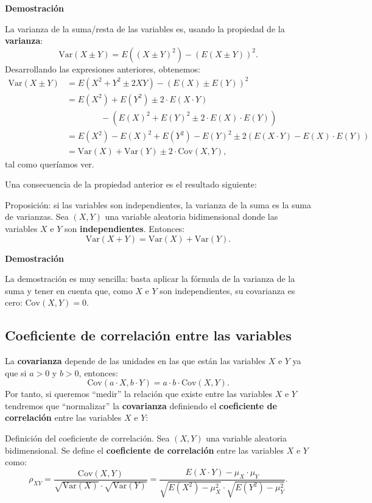 \documentclass[]{book}
\begin{document}
\textbf{Demostración}

La varianza de la suma/resta de las variables es, usando la propiedad de la \textbf{varianza}:
\[
\mathrm{Var}(X\pm Y)=E\left((X\pm Y)^2\right)-\left(E(X\pm Y)\right)^2.
\]
Desarrollando las expresiones anteriores, obtenemos:
\[
\begin{array}{rl}
\mathrm{Var}(X\pm Y) & =E\left(X^2+Y^2\pm 2XY\right)-\left(E(X)\pm E(Y)\right)^2 \\ & =
E(X^2)+E(Y^2)\pm 2\cdot E(X\cdot Y) \\ &\qquad\qquad - \left(E(X)^2+E(Y)^2\pm 2\cdot E(X)\cdot E(Y)\right)
\\ & = E(X^2)-E(X)^2+E(Y^2)-E(Y)^2\pm 2(E(X\cdot Y)-E(X)\cdot E(Y)) \\ & = \mathrm{Var}(X)+\mathrm{Var}(Y)\pm 2\cdot \mathrm{Cov}(X,Y),
\end{array}
\]
tal como queríamos ver.

Una consecuencia de la propiedad anterior es el resultado siguiente:

Proposición: si las variables son independientes, la varianza de la suma es la suma de varianzas.
Sea \((X,Y)\) una variable aleatoria bidimensional donde las variables \(X\) e \(Y\) son \textbf{independientes}.
Entonces:
\[
\mathrm{Var}(X+Y)=\mathrm{Var}(X)+\mathrm{Var}(Y).
\]

\textbf{Demostración}

La demostración es muy sencilla: basta aplicar la fórmula de la varianza de la suma y tener en cuenta que, como \(X\) e \(Y\) son independientes, su covarianza es cero: \(\mathrm{Cov}(X,Y)=0\).

\hypertarget{coeficiente-de-correlaciuxf3n-entre-las-variables}{%
\subsection{Coeficiente de correlación entre las variables}\label{coeficiente-de-correlaciuxf3n-entre-las-variables}}

La \textbf{covarianza} depende de las unidades en las que están las variables \(X\) e \(Y\) ya que si \(a>0\) y \(b>0\), entonces:
\[
\mathrm{Cov}(a\cdot X,b\cdot Y)=a\cdot b\cdot \mathrm{Cov}(X,Y).
\]
Por tanto, si queremos ``medir'' la relación que existe entre las variables \(X\) e \(Y\) tendremos que ``normalizar'' la \textbf{covarianza} definiendo el \textbf{coeficiente de correlación} entre las variables \(X\) e \(Y\):

Definición del coeficiente de correlación.
Sea \((X,Y)\) una variable aleatoria bidimensional. Se define el \textbf{coeficiente de correlación} entre las variables \(X\) e \(Y\) como:
\[
\rho_{XY}=\frac{\mathrm{Cov}(X,Y)}{\sqrt{\mathrm{Var}(X)}\cdot\sqrt{\mathrm{Var}(Y)}}=\frac{E(X\cdot Y)-\mu_X\cdot \mu_Y}{\sqrt{E\left(X^2\right)-\mu_X^2}\cdot \sqrt{E\left(Y^2\right)-\mu_Y^2}}.
\]
\end{document}
